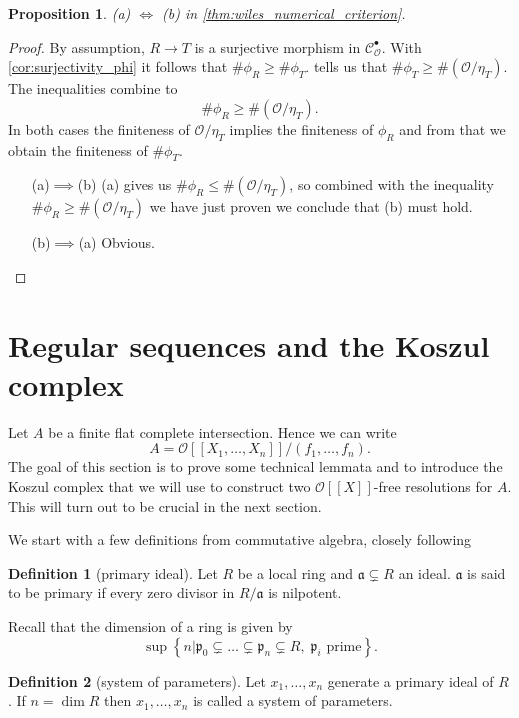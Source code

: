 \documentclass{article}
\theoremstyle{plain}%
\newtheorem{proposition}{Proposition}[section]
\theoremstyle{definition}
\newtheorem{definition}{Definition}[section]
\theoremstyle{remark}
\newcommand{\cob}{\mathcal{C}_\mathcal{O}^\bullet}
\begin{document}
\begin{proposition}\textup{\cite[cf.][corollary 5.6]{darmon1995fermat}}
    (a) \(\Leftrightarrow\) (b) in \cref{thm:wiles_numerical_criterion}.
\end{proposition}
\begin{proof}
    By assumption, \(R \to T\) is a surjective morphism in \(\cob\).
    With \cref{cor:surjectivity_phi} it follows that \(\#\phi_R \geq \#\phi_T\).  
    tells us that \(\#\phi_T \geq \#(\mathcal{O}/\eta_T)\).
    The inequalities combine to \[\#\phi_R \geq \#(\mathcal{O}/\eta_T).\]
    In both cases the finiteness of \(\mathcal{O}/\eta_T\) implies the finiteness of \(\phi_R\)
    and from that we obtain the finiteness of \(\#\phi_T\).
    \begin{itemize}
        \item[(a)\(\implies\)(b)] (a) gives us \(\#\phi_R \leq \#(\mathcal{O}/\eta_T)\), so combined with the 
        inequality \(\#\phi_R \geq \#(\mathcal{O}/\eta_T)\) we have just proven we conclude that (b) must hold.
        \item[(b)\(\implies\)(a)] Obvious.
    \end{itemize}      
\end{proof}

\section{Regular sequences and the Koszul complex}
Let \(A\) be a finite flat complete intersection. Hence we can write 
\[A = \mathcal{O}[[X_1, \dots, X_n]]/(f_1, \dots, f_n).\]
The goal of this section is to prove some technical lemmata and to introduce
the Koszul complex that we will use to construct two \(\mathcal{O}[[X]]\)-free resolutions for \(A\).
This will turn out to be crucial in the next section.

We start with a few definitions from commutative algebra, closely following \cite[sec. 5.3]{darmon1995fermat}
\begin{definition}[primary ideal]
    Let \(R\) be a local ring and \(\mathfrak{a} \subsetneq R\) an ideal. 
    \(\mathfrak{a}\) is said to be primary if every zero divisor in \(R/\mathfrak{a}\) is nilpotent.
\end{definition}
Recall that the dimension of a ring is given by
\[
    \sup \left\{n | 
                \mathfrak{p}_0 \subsetneq \dots \subsetneq \mathfrak{p}_n \subsetneq R,\; \mathfrak{p}_i \text{ prime} 
        \right\}.
\]
\begin{definition}[system of parameters]
    Let \(x_1, \dots, x_n\) generate a primary ideal of \(R\). If \(n = \dim R\) then \(x_1, \dots, x_n\) is called 
    a system of parameters.
\end{definition}
\end{document}
